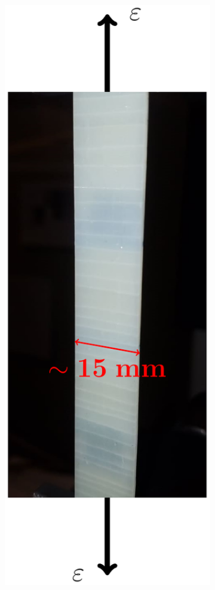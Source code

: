 \begin{figure}[!h]
\centering
    \begin{subfigure}[b]{0.45\textwidth}
        \includegraphics[width=\textwidth]{pics/transversecracks-macro.pdf}

\end{subfigure}
\end{figure}
